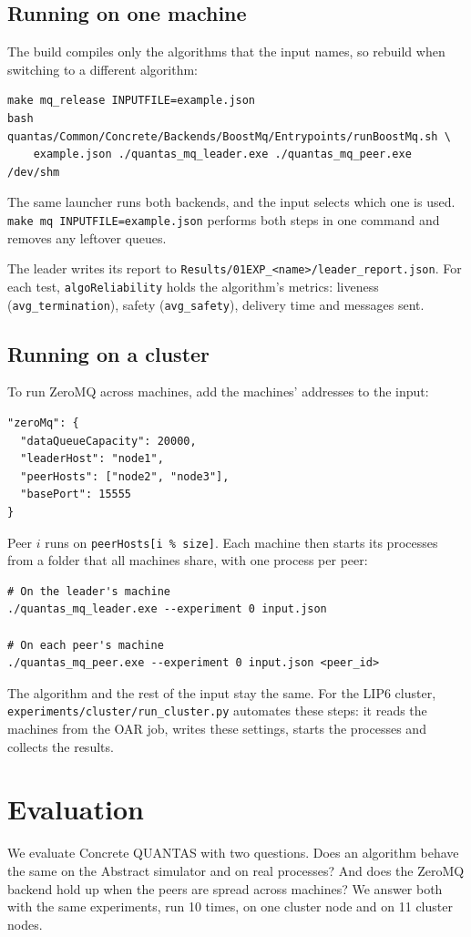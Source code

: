 \documentclass[11pt,a4paper]{article}
\newcommand{\code}[1]{\texttt{#1}}
\begin{document}
\subsection{Running on one machine}

The build compiles only the algorithms that the input names, so rebuild when switching to a
different algorithm:
\begin{lstlisting}
make mq_release INPUTFILE=example.json
bash quantas/Common/Concrete/Backends/BoostMq/Entrypoints/runBoostMq.sh \
    example.json ./quantas_mq_leader.exe ./quantas_mq_peer.exe /dev/shm
\end{lstlisting}
The same launcher runs both backends, and the input selects which one is used.
\code{make mq INPUTFILE=example.json} performs both steps in one command and removes any leftover
queues.

The leader writes its report to \code{Results/01EXP\_<name>/leader\_report.json}. For each test,
\code{algoReliability} holds the algorithm's metrics: liveness (\code{avg\_termination}), safety
(\code{avg\_safety}), delivery time and messages sent.

\subsection{Running on a cluster}

To run ZeroMQ across machines, add the machines' addresses to the input:
\begin{lstlisting}
"zeroMq": {
  "dataQueueCapacity": 20000,
  "leaderHost": "node1",
  "peerHosts": ["node2", "node3"],
  "basePort": 15555
}
\end{lstlisting}
Peer $i$ runs on \code{peerHosts[i \% size]}. Each machine then starts its processes from a folder
that all machines share, with one process per peer:
\begin{lstlisting}
# On the leader's machine
./quantas_mq_leader.exe --experiment 0 input.json

# On each peer's machine
./quantas_mq_peer.exe --experiment 0 input.json <peer_id>
\end{lstlisting}
The algorithm and the rest of the input stay the same. For the LIP6 cluster,
\code{experiments/\allowbreak cluster/\allowbreak run\_cluster.py} automates these steps: it reads the machines from the OAR
job, writes these settings, starts the processes and collects the results.

\section{Evaluation}
We evaluate Concrete QUANTAS with two questions. Does an algorithm behave the same on the Abstract
simulator and on real processes? And does the ZeroMQ backend hold up when the peers are spread
across machines? We answer both with the same experiments, run 10 times, on one cluster node and on
11 cluster nodes.
\end{document}

